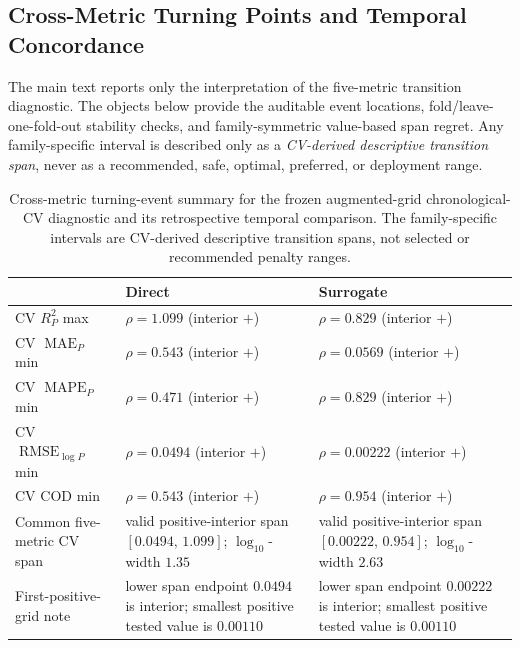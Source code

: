 \documentclass[10pt]{article}
\theoremstyle{definition}
\newcommand{\1}{\mathbf{1}}
\begin{document}
\subsection{\texorpdfstring{Cross-Metric Turning Points and Temporal Concordance}{Cross-Metric Turning Points and Temporal Concordance}}
\label{subsec:transition_appendix}


The main text reports only the interpretation of the five-metric transition diagnostic. The objects below provide the auditable event locations, fold/leave-one-fold-out stability checks, and family-symmetric value-based span regret. Any family-specific interval is described only as a \emph{CV-derived descriptive transition span}, never as a recommended, safe, optimal, preferred, or deployment range.

\begin{table}[!htbp]
\centering
\scriptsize
\setlength{\tabcolsep}{3.2pt}
\renewcommand{\arraystretch}{1.08}
\caption{Cross-metric turning-event summary for the frozen augmented-grid chronological-CV diagnostic and its retrospective temporal comparison. The family-specific intervals are CV-derived descriptive transition spans, not selected or recommended penalty ranges.}
\label{tab:transition_summary}
\begin{tabularx}{\textwidth}{@{} l >{\raggedright\arraybackslash}X >{\raggedright\arraybackslash}X @{}}
\toprule
& \textbf{Direct} & \textbf{Surrogate} \\
\midrule
CV $R^2_P$ max & $\rho=1.099$ (interior $+$)
& $\rho=0.829$ (interior $+$) \\
CV $\operatorname{MAE}_P$ min & $\rho=0.543$ (interior $+$)
& $\rho=0.0569$ (interior $+$) \\
CV $\operatorname{MAPE}_P$ min & $\rho=0.471$ (interior $+$)
& $\rho=0.829$ (interior $+$) \\
CV $\operatorname{RMSE}_{\log P}$ min & $\rho=0.0494$ (interior $+$)
& $\rho=0.00222$ (interior $+$) \\
CV COD min & $\rho=0.543$ (interior $+$)
& $\rho=0.954$ (interior $+$) \\
\addlinespace
Common five-metric CV span
& valid positive-interior span $[0.0494,\,1.099]$; $\log_{10}$-width $1.35$
& valid positive-interior span $[0.00222,\,0.954]$; $\log_{10}$-width $2.63$ \\
First-positive-grid note
& lower span endpoint $0.0494$ is interior; smallest positive tested value is $0.00110$
& lower span endpoint $0.00222$ is interior; smallest positive tested value is $0.00110$ \\

\end{tabularx}
\end{table}
\end{document}
